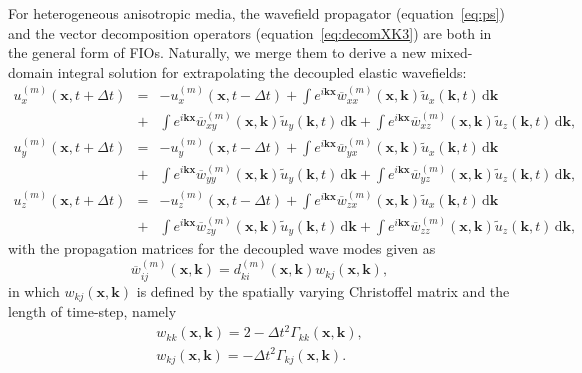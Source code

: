 For heterogeneous anisotropic media, the wavefield propagator (equation~\ref{eq:ps}) and the
vector decomposition operators (equation~\ref{eq:decomXK3}) are both in the general form of
FIOs. Naturally, we merge them to derive a new mixed-domain integral solution
for extrapolating the decoupled elastic wavefields:
\begin{equation}
\begin{array}{lcl}
\label{eq:extrapdecom3}
u_{x}^{(m)}(\mathbf{x},t+\Delta{t})&=&-u_{x}^{(m)}(\mathbf{x},t-\Delta{t})
+\int{e^{i\mathbf{k}\mathbf{x}}\overline{w}_{xx}^{(m)}(\mathbf{x},\mathbf{k})\tilde{u}_x(\mathbf{k},t)}\,\mathrm{d}\mathbf{k}
\\
&+&\int{e^{i\mathbf{k}\mathbf{x}}\overline{w}_{xy}^{(m)}(\mathbf{x},\mathbf{k})\tilde{u}_y(\mathbf{k},t)}\,\mathrm{d}\mathbf{k}
+\int{e^{i\mathbf{k}\mathbf{x}}\overline{w}_{xz}^{(m)}(\mathbf{x},\mathbf{k})\tilde{u}_z(\mathbf{k},t)}\,\mathrm{d}\mathbf{k}, \\
u_{y}^{(m)}(\mathbf{x},t+\Delta{t})&=&-u_{y}^{(m)}(\mathbf{x},t-\Delta{t})
+\int{e^{i\mathbf{k}\mathbf{x}}\overline{w}_{yx}^{(m)}(\mathbf{x},\mathbf{k})\tilde{u}_x(\mathbf{k},t)}\,\mathrm{d}\mathbf{k}
\\
&+&\int{e^{i\mathbf{k}\mathbf{x}}\overline{w}_{yy}^{(m)}(\mathbf{x},\mathbf{k})\tilde{u}_y(\mathbf{k},t)}\,\mathrm{d}\mathbf{k}
+\int{e^{i\mathbf{k}\mathbf{x}}\overline{w}_{yz}^{(m)}(\mathbf{x},\mathbf{k})\tilde{u}_z(\mathbf{k},t)}\,\mathrm{d}\mathbf{k}, \\
u_{z}^{(m)}(\mathbf{x},t+\Delta{t})&=&-u_{z}^{(m)}(\mathbf{x},t-\Delta{t})
+\int{e^{i\mathbf{k}\mathbf{x}}\overline{w}_{zx}^{(m)}(\mathbf{x},\mathbf{k})\tilde{u}_x(\mathbf{k},t)}\,\mathrm{d}\mathbf{k}
\\
&+&\int{e^{i\mathbf{k}\mathbf{x}}\overline{w}_{zy}^{(m)}(\mathbf{x},\mathbf{k})\tilde{u}_y(\mathbf{k},t)}\,\mathrm{d}\mathbf{k}
+\int{e^{i\mathbf{k}\mathbf{x}}\overline{w}_{zz}^{(m)}(\mathbf{x},\mathbf{k})\tilde{u}_z(\mathbf{k},t)}\,\mathrm{d}\mathbf{k},
\end{array}
\end{equation}
with the propagation matrices for the decoupled wave modes given as
\begin{equation}
\label{eq:op}
\overline{w}_{ij}^{(m)}(\mathbf{x},\mathbf{k}) =
d_{ki}^{(m)}(\mathbf{x},\mathbf{k})w_{kj}{(\mathbf{x},\mathbf{k})},
\end{equation}
in which $w_{kj}(\mathbf{x},\mathbf{k})$ is defined by the spatially varying Christoffel
matrix and the length of time-step, namely
\begin{equation}
	\begin{array}{lcl} 
		\label{eq:extrap}
		w_{kk}(\mathbf{x},\mathbf{k})=2-\Delta{t}^2\Gamma_{kk}{(\mathbf{x},\mathbf{k})}, \\
		w_{kj}(\mathbf{x},\mathbf{k})=-\Delta{t}^2\Gamma_{kj}{(\mathbf{x},\mathbf{k})}. \\
	\end{array}
\end{equation}
